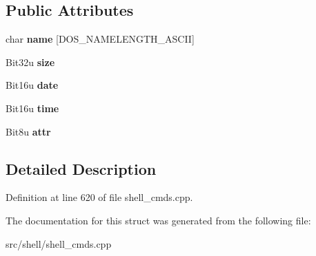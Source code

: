 \subsection*{Public Attributes}
\begin{DoxyCompactItemize}
\item 
\hypertarget{structDtaResult_a35acc0819ed5d484ae67b0a150702e65}{char {\bfseries name} \mbox{[}D\-O\-S\-\_\-\-N\-A\-M\-E\-L\-E\-N\-G\-T\-H\-\_\-\-A\-S\-C\-I\-I\mbox{]}}\label{structDtaResult_a35acc0819ed5d484ae67b0a150702e65}

\item 
\hypertarget{structDtaResult_ae204e54f6811d77f19876e6b7856ca58}{Bit32u {\bfseries size}}\label{structDtaResult_ae204e54f6811d77f19876e6b7856ca58}

\item 
\hypertarget{structDtaResult_ab6706554a1f9124eaf932dfff90dc962}{Bit16u {\bfseries date}}\label{structDtaResult_ab6706554a1f9124eaf932dfff90dc962}

\item 
\hypertarget{structDtaResult_a654e696728853f730e909750a2b35932}{Bit16u {\bfseries time}}\label{structDtaResult_a654e696728853f730e909750a2b35932}

\item 
\hypertarget{structDtaResult_a01eb3c4fe466f291e8ffd3d788ee9d6c}{Bit8u {\bfseries attr}}\label{structDtaResult_a01eb3c4fe466f291e8ffd3d788ee9d6c}

\end{DoxyCompactItemize}


\subsection{Detailed Description}


Definition at line 620 of file shell\-\_\-cmds.\-cpp.



The documentation for this struct was generated from the following file\-:\begin{DoxyCompactItemize}
\item 
src/shell/shell\-\_\-cmds.\-cpp\end{DoxyCompactItemize}
